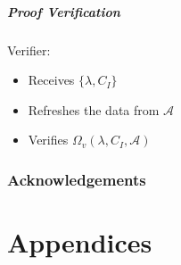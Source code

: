 \documentclass[a4paper]{article}
\begin{document}
\subsubsection{Proof Verification}
Verifier:
\begin{itemize}
    \item Receives $\{\lambda, C_I\}$
    \item Refreshes the data from $\mathcal{A}$
    \item Verifies $\Omega_v(\lambda, C_I, \mathcal{A})$
\end{itemize}

\section{Acknowledgements}




\part{Appendices}
\appendix
\end{document}
